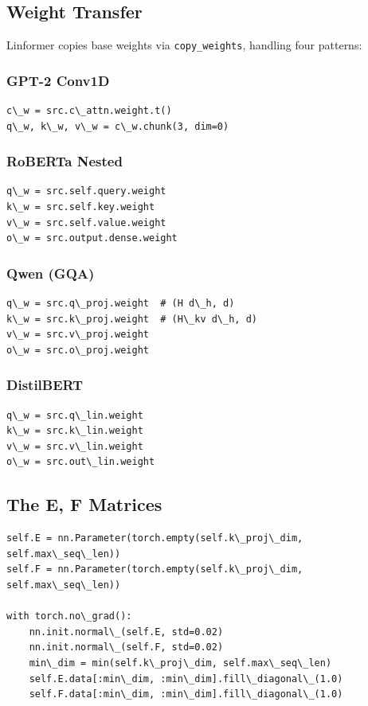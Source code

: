 \subsection{Weight Transfer}

Linformer copies base weights via \texttt{copy\_weights}, handling four patterns:

\subsubsection{GPT-2 Conv1D}

\begin{lstlisting}
c\_w = src.c\_attn.weight.t()
q\_w, k\_w, v\_w = c\_w.chunk(3, dim=0)
\end{lstlisting}

\subsubsection{RoBERTa Nested}

\begin{lstlisting}
q\_w = src.self.query.weight
k\_w = src.self.key.weight
v\_w = src.self.value.weight
o\_w = src.output.dense.weight
\end{lstlisting}

\subsubsection{Qwen (GQA)}

\begin{lstlisting}
q\_w = src.q\_proj.weight  # (H d\_h, d)
k\_w = src.k\_proj.weight  # (H\_kv d\_h, d)
v\_w = src.v\_proj.weight
o\_w = src.o\_proj.weight
\end{lstlisting}

\subsubsection{DistilBERT}

\begin{lstlisting}
q\_w = src.q\_lin.weight
k\_w = src.k\_lin.weight
v\_w = src.v\_lin.weight
o\_w = src.out\_lin.weight
\end{lstlisting}

\subsection{The E, F Matrices}

\begin{lstlisting}
self.E = nn.Parameter(torch.empty(self.k\_proj\_dim, self.max\_seq\_len))
self.F = nn.Parameter(torch.empty(self.k\_proj\_dim, self.max\_seq\_len))

with torch.no\_grad():
    nn.init.normal\_(self.E, std=0.02)
    nn.init.normal\_(self.F, std=0.02)
    min\_dim = min(self.k\_proj\_dim, self.max\_seq\_len)
    self.E.data[:min\_dim, :min\_dim].fill\_diagonal\_(1.0)
    self.F.data[:min\_dim, :min\_dim].fill\_diagonal\_(1.0)
\end{lstlisting}

